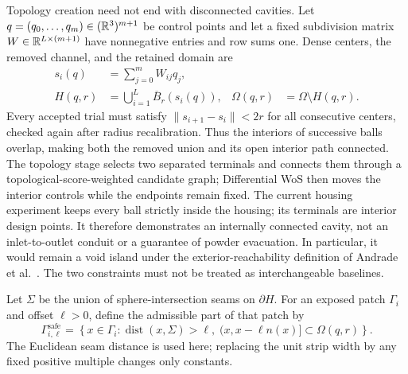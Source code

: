 Topology creation need not end with disconnected cavities.  Let
$q=(q_0,\ldots,q_m)\in(\mathbb{R}^3)^{m+1}$ be control points and let a fixed
subdivision matrix $W\in\mathbb{R}^{L\times(m+1)}$ have nonnegative entries and row
sums one.  Dense centers, the removed channel, and the retained domain are
\begin{equation}
 \begin{aligned}
  s_i(q)&=\sum_{j=0}^{m}W_{ij}q_j,\\
  H(q,r)&=\bigcup_{i=1}^{L}\overline B_r(s_i(q)),
  &\Omega(q,r)&=\Omega\setminus H(q,r).
 \end{aligned}
 \label{eq:channelparameterization}
\end{equation}
Every accepted trial must satisfy $\|s_{i+1}-s_i\|<2r$ for all consecutive
centers, checked again after radius recalibration.  Thus the interiors of
successive balls overlap, making both the removed union and its open interior
path connected.  The
topology stage selects two separated terminals and connects them through a
topological-score-weighted candidate graph; Differential WoS then moves the
interior controls while the endpoints remain fixed.
The current housing experiment keeps every ball strictly inside the housing;
its terminals are interior design points.  It therefore demonstrates an
internally connected cavity, not an inlet-to-outlet conduit or a guarantee of
powder evacuation.  In particular, it would remain a void island under the
exterior-reachability definition of Andrade et al.~\cite{andrade2026connectivity}.
The two constraints must not be treated as interchangeable baselines.

Let $\Sigma$ be the union of sphere-intersection seams on $\partial H$.  For
an exposed patch $\Gamma_i$ and offset $\ell>0$, define the admissible part
of that patch by
\begin{equation}
 \Gamma_{i,\ell}^{\mathrm{safe}}=
 \left\{x\in\Gamma_i:
 \operatorname{dist}(x,\Sigma)>\ell,\;
 (x,x-\ell n(x)]\subset\Omega(q,r)\right\}.
 \label{eq:channelsafepatch}
\end{equation}
The Euclidean seam distance is used here; replacing the unit strip width by
any fixed positive multiple changes only constants.

